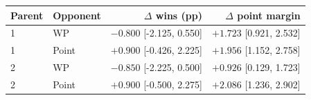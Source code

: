 \begin{tabular}{llrr}
\toprule
Parent & Opponent & $\Delta$ wins (pp) & $\Delta$ point margin \\
\midrule
1 & WP & $-0.800$ [-2.125, 0.550] & $+1.723$ [0.921, 2.532] \\
1 & Point & $+0.900$ [-0.426, 2.225] & $+1.956$ [1.152, 2.758] \\
2 & WP & $-0.850$ [-2.225, 0.500] & $+0.926$ [0.129, 1.723] \\
2 & Point & $+0.900$ [-0.500, 2.275] & $+2.086$ [1.236, 2.902] \\
\bottomrule
\end{tabular}
